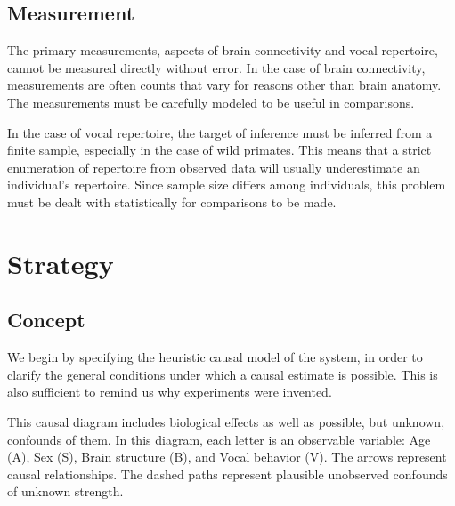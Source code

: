 \documentclass[reqno ,11pt]{amsart}
\begin{document}
\subsection{Measurement} The primary measurements, aspects of brain connectivity and vocal repertoire, cannot be measured directly without error. 
In the case of brain connectivity, measurements are often counts that vary for reasons other than brain anatomy. The measurements must be carefully modeled to be useful in comparisons. 

In the case of vocal repertoire, the target of inference must be inferred from a finite sample, especially in the case of wild primates. This means that a strict enumeration of repertoire from observed data will usually underestimate an individual's repertoire. Since sample size differs among individuals, this problem must be dealt with statistically for comparisons to be made.

\section{Strategy}

\subsection{Concept}

We begin by specifying the heuristic causal model of the system, in order to clarify the general conditions under which a causal estimate is possible. This is also sufficient to remind us why experiments were invented.

\begin{center}
\end{center}
This causal diagram includes biological effects as well as possible, but unknown, confounds of them. 
In this diagram, each letter is an observable variable: Age (A), Sex (S), Brain structure (B), and Vocal behavior (V). The arrows represent causal relationships. The dashed paths represent plausible unobserved confounds of unknown strength.
\end{document}
